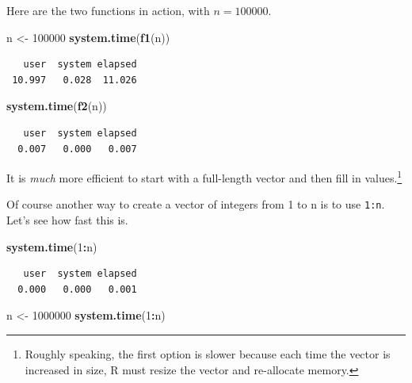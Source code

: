 \documentclass[
]{krantz}
\makeatletter
\newenvironment{Shaded}{\begin{snugshade}}{\end{snugshade}}
\newcommand{\DecValTok}[1]{\textcolor[rgb]{0.06,0.06,0.06}{#1}}
\newcommand{\KeywordTok}[1]{\textcolor[rgb]{0.27,0.27,0.27}{\textbf{#1}}}
\newcommand{\NormalTok}[1]{#1}
\newcommand{\OperatorTok}[1]{\textcolor[rgb]{0.43,0.43,0.43}{\textbf{#1}}}
\newcommand{\StringTok}[1]{\textcolor[rgb]{0.5,0.5,0.5}{#1}}
\newenvironment{kframe}{%
\medskip{}
\setlength{\fboxsep}{.8em}
 \def\at@end@of@kframe{}%
 \ifinner\ifhmode%
  \def\at@end@of@kframe{\end{minipage}}%
  \begin{minipage}{\columnwidth}%
 \fi\fi%
 \def\FrameCommand##1{\hskip\@totalleftmargin \hskip-\fboxsep
 \colorbox{shadecolor}{##1}\hskip-\fboxsep
     \hskip-\linewidth \hskip-\@totalleftmargin \hskip\columnwidth}%
 \MakeFramed {\advance\hsize-\width
   \@totalleftmargin\z@ \linewidth\hsize
   \@setminipage}}%
 {\par\unskip\endMakeFramed%
 \at@end@of@kframe}
\renewenvironment{Shaded}{\begin{kframe}}{\end{kframe}}
\makeatother
\begin{document}
Here are the two functions in action, with \(n = 100000\).

\begin{Shaded}
\begin{Highlighting}[]
\NormalTok{n \textless{}{-}}\StringTok{ }\DecValTok{100000}
\KeywordTok{system.time}\NormalTok{(}\KeywordTok{f1}\NormalTok{(n))}
\end{Highlighting}
\end{Shaded}

\begin{verbatim}
   user  system elapsed 
 10.997   0.028  11.026 
\end{verbatim}

\begin{Shaded}
\begin{Highlighting}[]
\KeywordTok{system.time}\NormalTok{(}\KeywordTok{f2}\NormalTok{(n))}
\end{Highlighting}
\end{Shaded}

\begin{verbatim}
   user  system elapsed 
  0.007   0.000   0.007 
\end{verbatim}

It is \emph{much} more efficient to start with a full-length vector and then fill in values.\footnote{Roughly speaking, the first option is slower because each time the vector is increased in size, R must resize the vector and re-allocate memory.}

Of course another way to create a vector of integers from 1 to n is to use \texttt{1:n}. Let's see how fast this is.

\begin{Shaded}
\begin{Highlighting}[]
\KeywordTok{system.time}\NormalTok{(}\DecValTok{1}\OperatorTok{:}\NormalTok{n)}
\end{Highlighting}
\end{Shaded}

\begin{verbatim}
   user  system elapsed 
  0.000   0.000   0.001 
\end{verbatim}

\begin{Shaded}
\begin{Highlighting}[]
\NormalTok{n \textless{}{-}}\StringTok{ }\DecValTok{1000000}
\KeywordTok{system.time}\NormalTok{(}\DecValTok{1}\OperatorTok{:}\NormalTok{n)      }
\end{Highlighting}
\end{Shaded}
\end{document}
